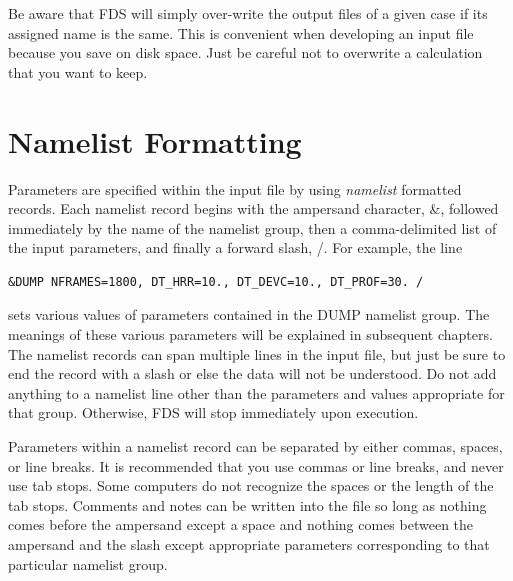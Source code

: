 \documentclass[11pt]{book}
\begin{document}
Be aware that FDS will simply over-write the output files of a given case if its assigned
name is the same. This is convenient when developing an input file because you save on disk space. Just be careful
not to overwrite a calculation that you want to keep.



\section{Namelist Formatting}

\noindent
Parameters are specified within the input file by using {\em namelist} formatted records.
Each namelist record begins with the ampersand character, {\ct \&}, followed
immediately by the name of the namelist group, then a comma-delimited list of the input parameters, and
finally a forward slash, {\ct /}. For example, the line
\begin{lstlisting}
&DUMP NFRAMES=1800, DT_HRR=10., DT_DEVC=10., DT_PROF=30. /
\end{lstlisting}
\noindent sets various values of parameters contained in the {\ct DUMP} namelist group. The meanings of these various parameters will
be explained in subsequent chapters. The namelist records can span multiple lines in the input file, but just be sure to
end the record with a slash or else the data will not be understood. Do not add anything to a namelist line other than the
parameters and values appropriate for that group. Otherwise, FDS will stop immediately upon execution.

Parameters within a namelist record can be separated by either commas, spaces, or line breaks. It is recommended that you use
commas or line breaks, and never use tab stops. Some computers do not recognize the spaces or the length of the tab stops.
Comments and notes can be written into the file so long as nothing comes
before the ampersand except a space and nothing comes between the ampersand
and the slash except appropriate parameters corresponding
to that particular namelist group.
\end{document}
